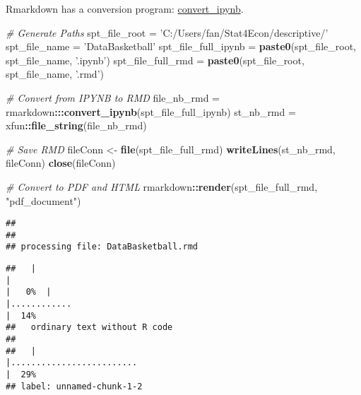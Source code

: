 \documentclass[
]{article}
\newenvironment{Shaded}{\begin{snugshade}}{\end{snugshade}}
\newcommand{\CommentTok}[1]{\textcolor[rgb]{0.56,0.35,0.01}{\textit{#1}}}
\newcommand{\KeywordTok}[1]{\textcolor[rgb]{0.13,0.29,0.53}{\textbf{#1}}}
\newcommand{\NormalTok}[1]{#1}
\newcommand{\OperatorTok}[1]{\textcolor[rgb]{0.81,0.36,0.00}{\textbf{#1}}}
\newcommand{\StringTok}[1]{\textcolor[rgb]{0.31,0.60,0.02}{#1}}
\begin{document}
Rmarkdown has a conversion program:
\href{https://rmarkdown.rstudio.com/docs/reference/convert_ipynb.html}{convert\_ipynb}.

\begin{Shaded}
\begin{Highlighting}[]
\CommentTok{# Generate Paths}
\NormalTok{spt_file_root =}\StringTok{ 'C:/Users/fan/Stat4Econ/descriptive/'}
\NormalTok{spt_file_name =}\StringTok{ 'DataBasketball'}
\NormalTok{spt_file_full_ipynb =}\StringTok{ }\KeywordTok{paste0}\NormalTok{(spt_file_root, spt_file_name, }\StringTok{'.ipynb'}\NormalTok{)}
\NormalTok{spt_file_full_rmd =}\StringTok{ }\KeywordTok{paste0}\NormalTok{(spt_file_root, spt_file_name, }\StringTok{'.rmd'}\NormalTok{)}

\CommentTok{# Convert from IPYNB to RMD}
\NormalTok{file_nb_rmd =}\StringTok{ }\NormalTok{rmarkdown}\OperatorTok{:::}\KeywordTok{convert_ipynb}\NormalTok{(spt_file_full_ipynb)}
\NormalTok{st_nb_rmd =}\StringTok{ }\NormalTok{xfun}\OperatorTok{::}\KeywordTok{file_string}\NormalTok{(file_nb_rmd)}

\CommentTok{# Save RMD}
\NormalTok{fileConn <-}\StringTok{ }\KeywordTok{file}\NormalTok{(spt_file_full_rmd)}
\KeywordTok{writeLines}\NormalTok{(st_nb_rmd, fileConn)}
\KeywordTok{close}\NormalTok{(fileConn)}

\CommentTok{# Convert to PDF and HTML}
\NormalTok{rmarkdown}\OperatorTok{::}\KeywordTok{render}\NormalTok{(spt_file_full_rmd, }\StringTok{"pdf_document"}\NormalTok{)}
\end{Highlighting}
\end{Shaded}

\begin{verbatim}
## 
## 
## processing file: DataBasketball.rmd
\end{verbatim}

\begin{verbatim}
##   |                                                                                              |                                                                                      |   0%  |                                                                                              |............                                                                          |  14%
##   ordinary text without R code
## 
##   |                                                                                              |.........................                                                             |  29%
## label: unnamed-chunk-1-2
\end{verbatim}
\end{document}
